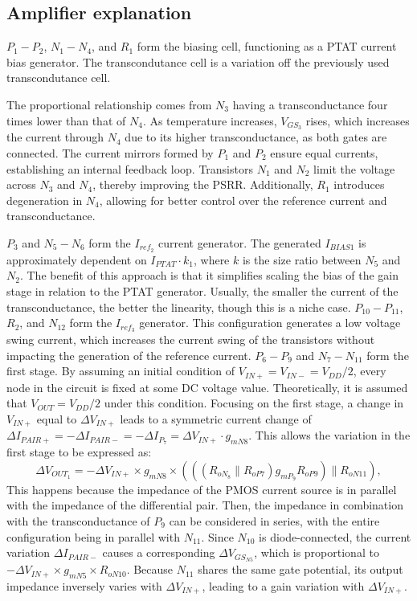 \documentclass[12pt]{article}
\begin{document}
\subsection{Amplifier explanation}
$P_1 - P_2$, $N_1 - N_4$, and $R_1$ form the biasing cell, functioning as a PTAT current bias generator.  The transcondutance cell is a variation off the previously used transcondutance cell.

The proportional relationship comes from $N_3$ having a transconductance four times lower than that of $N_4$. As temperature increases, $V_{GS_3}$ rises, which increases the current through $N_4$ due to its higher transconductance, as both gates are connected. The current mirrors formed by $P_1$ and $P_2$ ensure equal currents, establishing an internal feedback loop. Transistors $N_1$ and $N_2$ limit the voltage across $N_3$ and $N_4$, thereby improving the PSRR. Additionally, $R_1$ introduces degeneration in $N_4$, allowing for better control over the reference current and transconductance.

$P_3$ and $N_5-N_6$ form the $I_{ref_2}$ current generator. The generated $I_{BIAS1}$ is approximately dependent on $I_{PTAT} \cdot k_1$, where $k$ is the size ratio between $N_5$ and $N_2$. The benefit of this approach is that it simplifies scaling the bias of the gain stage in relation to the PTAT generator. Usually, the smaller the current of the transconductance, the better the linearity, though this is a niche case. $P_{10}-P_{11}$, $R_2$, and $N_{12}$ form the $I_{ref_3}$ generator. This configuration generates a low voltage swing current, which increases the current swing of the transistors without impacting the generation of the reference current. $P_6-P_9$ and $N_7-N_{11}$ form the first stage.  By assuming an initial condition of $V_{IN+} = V_{IN-} = V_{DD}/2$, every node in the circuit is fixed at some DC voltage value. Theoretically, it is assumed that $V_{OUT} = V_{DD}/2$ under this condition. Focusing on the first stage, a change in $V_{IN+}$ equal to $\Delta V_{IN+}$ leads to a symmetric current change of $\Delta I_{PAIR+} = -\Delta I_{PAIR-} = -\Delta I_{P_7} = \Delta V_{IN+} \cdot g_{mN8}$. This allows the variation in the first stage to be expressed as: \[ \Delta V_{OUT_1} = -\Delta V_{IN+} \times g_{mN8} \times \left( ((R_{oN_{8}} \parallel R_{oP7}) g_{mP_9} R_{oP9}) \parallel R_{oN11} \right), \] This happens because the impedance of the PMOS current source is in parallel with the impedance of the differential pair. Then, the impedance in combination with the transconductance of $P_9$ can be considered in series, with the entire configuration being in parallel with $N_{11}$.  Since $N_{10}$ is diode-connected, the current variation $\Delta I_{PAIR-}$ causes a corresponding $\Delta V_{GS_{N5}}$, which is proportional to $-\Delta V_{IN+} \times g_{mN5} \times R_{oN10}$. Because $N_{11}$ shares the same gate potential, its output impedance inversely varies with $\Delta V_{IN+}$, leading to a gain variation with $\Delta V_{IN+}$. 
\end{document}
